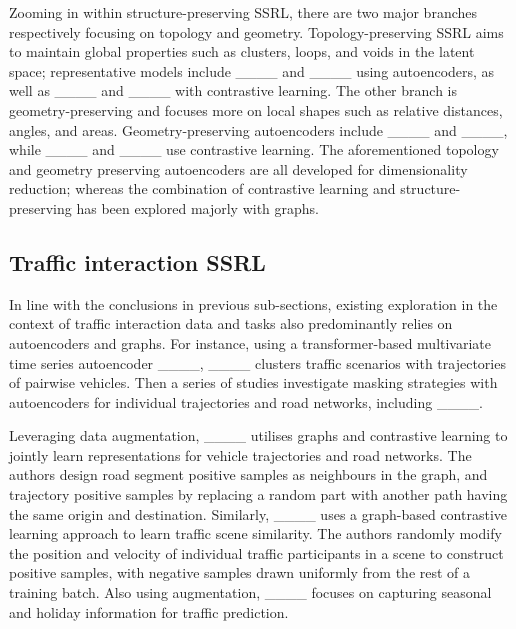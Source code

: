 Zooming in within structure-preserving SSRL, there are two major branches respectively focusing on topology and geometry. Topology-preserving SSRL aims to maintain global properties such as clusters, loops, and voids in the latent space; representative models include ____ and ____ using autoencoders, as well as ____ and ____ with contrastive learning. The other branch is geometry-preserving and focuses more on local shapes such as relative distances, angles, and areas. Geometry-preserving autoencoders include ____ and ____, while ____ and ____ use contrastive learning. The aforementioned topology and geometry preserving autoencoders are all developed for dimensionality reduction; whereas the combination of contrastive learning and structure-preserving has been explored majorly with graphs.

\subsection{Traffic interaction SSRL}
In line with the conclusions in previous sub-sections, existing exploration in the context of traffic interaction data and tasks also predominantly relies on autoencoders and graphs. For instance, using a transformer-based multivariate time series autoencoder ____,  ____ clusters traffic scenarios with trajectories of pairwise vehicles. Then a series of studies investigate masking strategies with autoencoders for individual trajectories and road networks, including ____. 

Leveraging data augmentation, ____ utilises graphs and contrastive learning to jointly learn representations for vehicle trajectories and road networks. The authors design road segment positive samples as neighbours in the graph, and trajectory positive samples by replacing a random part with another path having the same origin and destination. Similarly, ____ uses a graph-based contrastive learning approach to learn traffic scene similarity. The authors randomly modify the position and velocity of individual traffic participants in a scene to construct positive samples, with negative samples drawn uniformly from the rest of a training batch. Also using augmentation, ____ focuses on capturing seasonal and holiday information for traffic prediction.

